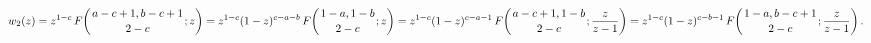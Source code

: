 \[w_{2}(z)={z^{1-c}}\mathop{F\/}\nolimits\!\left({a-c+1,b-c+1\atop 2-c};z\right)%
={z^{1-c}(1-z)^{c-a-b}}\*\mathop{F\/}\nolimits\!\left({1-a,1-b\atop 2-c};z%
\right)={z^{1-c}(1-z)^{c-a-1}}\*\mathop{F\/}\nolimits\!\left({a-c+1,1-b\atop 2%
-c};\frac{z}{z-1}\right)={z^{1-c}(1-z)^{c-b-1}}\*\mathop{F\/}\nolimits\!\left(%
{1-a,b-c+1\atop 2-c};\frac{z}{z-1}\right).\]
